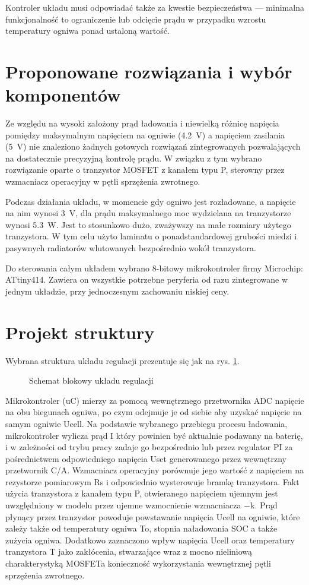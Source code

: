 \documentclass[polish,engineer]{polsl-msth}
\begin{document}
Kontroler układu musi odpowiadać także za kwestie bezpieczeństwa --- minimalna funkcjonalność to ograniczenie lub odcięcie prądu w przypadku wzrostu temperatury ogniwa ponad ustaloną wartość.

\section{Proponowane rozwiązania i wybór komponentów}
Ze względu na wysoki założony prąd ładowania i niewielką różnicę napięcia pomiędzy maksymalnym napięciem na ogniwie (4.2~V) a napięciem zasilania (5~V) nie znaleziono żadnych gotowych rozwiązań zintegrowanych pozwalających na dostatecznie precyzyjną kontrolę prądu. W związku z tym wybrano rozwiązanie oparte o tranzystor MOSFET z kanałem typu P, sterowny przez wzmacniacz operacyjny w pętli sprzężenia zwrotnego.

Podczas działania układu, w momencie gdy ogniwo jest rozładowane, a napięcie na nim wynosi 3~V, dla prądu maksymalnego moc wydzielana na tranzystorze wynosi 5.3~W. Jest to stosunkowo dużo, zważywszy na małe rozmiary użytego tranzystora. W tym celu użyto laminatu o ponadstandardowej grubości miedzi i pasywnych radiatorów wlutowanych bezpośrednio wokół tranzystora.

Do sterowania całym układem wybrano 8-bitowy mikrokontroler firmy Microchip: ATtiny414. Zawiera on wszystkie potrzebne peryferia od razu zintegrowane w jednym układzie, przy jednoczesnym zachowaniu niskiej ceny. 
\section{Projekt struktury}
Wybrana struktura układu regulacji prezentuje się jak na rys. \ref{dia:reg_all}. 
\begin{figure}
     \resizebox{\linewidth}{!}{}
     \caption{Schemat blokowy układu regulacji\label{dia:reg_all}}
\end{figure}

Mikrokontroler (uC) mierzy za pomocą wewnętrznego przetwornika ADC napięcie na obu biegunach ogniwa, po czym odejmuje je od siebie aby uzyskać napięcie na samym ogniwie Ucell. Na podstawie wybranego przebiegu procesu ładowania, mikrokontroler wylicza prąd I który powinien być aktualnie podawany na baterię, i w zależności od trybu pracy zadaje go bezpośrednio lub przez regulator PI za pośrednictwem odpowiedniego napięcia Uset generowanego przez wewnętrzny przetwornik C/A. Wzmacniacz operacyjny porównuje jego wartość z napięciem na rezystorze pomiarowym Rs i odpowiednio wysterowuje bramkę tranzystora. Fakt użycia tranzystora z kanałem typu P, otwieranego napięciem ujemnym jest uwzględniony w modelu przez ujemne wzmocnienie wzmacniacza $\mathrm{-k}$. Prąd płynący przez tranzystor powoduje powstawanie napięcia Ucell na ogniwie, które zależy także od temperatury ogniwa To, stopnia naładowania SOC a także zużycia ogniwa. Dodatkowo zaznaczono wpływ napięcia Ucell oraz temperatury tranzystora T jako zakłócenia, stwarzające wraz z mocno nieliniową charakterystyką MOSFETa konieczność wykorzystania wewnętrznej pętli sprzężenia zwrotnego.
\end{document}
